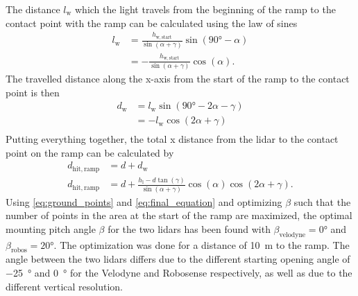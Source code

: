 The distance $l_\mathrm{w}$ which the light travels from the beginning of the ramp to the contact point with the ramp can be calculated using the law of sines
\begin{align}
	l_\mathrm{w} & = \frac{h_\mathrm{w,start} }{\sin(\alpha + \gamma)} \sin(\ang{90} - \alpha) \\
	             & = -\frac{h_\mathrm{w,start} }{\sin(\alpha + \gamma)} \cos(\alpha).
\end{align}
The travelled distance along the x-axis from the start of the ramp to the contact point is then
\begin{align}
	d_\mathrm{w} & = l_\mathrm{w} \sin(\ang{90} - 2\alpha - \gamma) \\
	             & = -l_\mathrm{w} \cos(2\alpha + \gamma)           \\
\end{align}
Putting everything together, the total x distance from the \gls{lidar} to the contact point on the ramp can be calculated by
\begin{align}
	d_\mathrm{hit,ramp} & = d + d_\mathrm{w}                                                                                    \\
	d_\mathrm{hit,ramp} & = d + \frac{h_\mathrm{l} - d\tan(\gamma)}{\sin(\alpha + \gamma)} \cos(\alpha) \cos(2\alpha + \gamma).
	\label{eq:final_equation}
\end{align}
Using \cref{eq:ground_points} and \cref{eq:final_equation} and optimizing $\beta$ such that the number of points in the area at the start of the ramp are maximized, the optimal mounting pitch angle $\beta$ for the two \gls{lidar}s has been found with $\beta_\mathrm{velodyne} = \ang{0}$ and $\beta_\mathrm{robos} = \ang{20}$.
The optimization was done for a distance of \SI{10}{\metre} to the ramp.
The angle between the two \gls{lidar}s differs due to the different starting opening angle of \SI{-25}{\degree} and \SI{0}{\degree} for the Velodyne and Robosense respectively, as well as due to the different vertical resolution.


